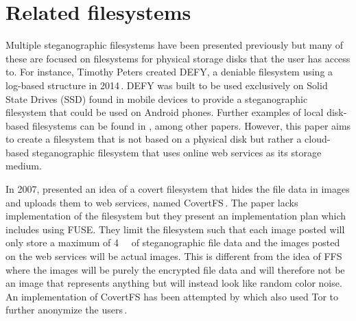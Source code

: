 \section{Related filesystems}
\label{sec:rel_fs}
Multiple steganographic filesystems have been presented previously but many of these are focused on filesystems for physical storage disks that the user has access to. For instance, Timothy Peters created DEFY, a deniable filesystem using a log-based structure in 2014\,\cite{petersDEFYDeniableFile2014}. DEFY was built to be used exclusively on Solid State Drives (\gls{SSD}) found in mobile devices to provide a steganographic filesystem that could be used on Android phones. Further examples of local disk-based filesystems can be found in \cite{andersonSteganographicFileSystem1998, mcdonaldStegFSSteganographicFile2000, domingo-ferrerSharedSteganographicFile2008, hanMultiuserSteganographicFile2010}, among other papers. However, this paper aims to create a filesystem that is not based on a physical disk but rather a cloud-based steganographic filesystem that uses online web services as its storage medium. 

In 2007, \citeauthor{baliga2007web} presented an idea of a covert filesystem that hides the file data in images and uploads them to web services, named CovertFS\,\cite{baliga2007web}. The paper lacks implementation of the filesystem but they present an implementation plan which includes using FUSE. They limit the filesystem such that each image posted will only store a maximum of \SI{4}{\kilo\byte} of steganographic file data and the images posted on the web services will be actual images. This is different from the idea of FFS where the images will be purely the encrypted file data and will therefore not be an image that represents anything but will instead look like random color noise. An implementation of CovertFS has been attempted by \citeauthor{sosaSuperSecretFile2007} which also used Tor to further anonymize the users\,\cite{sosaSuperSecretFile2007}.


